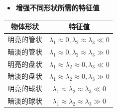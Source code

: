 \begin{frame}
\begin{itemize}
\item \textbf{增强不同形状所需的特征值}
\end{itemize}
\begin{table}[h]
\renewcommand{\arraystretch}{0.5}
\centering
\begin{tabular*}{80mm}{cc}
\toprule
\hspace{5mm} \bfseries \small{物体形状}  & \hspace{15mm}                    \bfseries \small{特征值}                       \\
\midrule
\hspace{5mm} \small{明亮的管状}          & \hspace{15mm}  \small{$\lambda_1 \approx 0, \lambda_2 \approx \lambda_3 \ll 0$} \\
\hspace{5mm} \small{暗淡的管状}          & \hspace{15mm}  \small{$\lambda_1 \approx 0, \lambda_2 \approx \lambda_3 \gg 0$} \\
\hspace{5mm} \small{明亮的盘状}          & \hspace{15mm}  \small{$\lambda_1 \approx \lambda_2 \approx 0, \lambda_3 \ll 0$} \\
\hspace{5mm} \small{暗淡的盘状}          & \hspace{15mm}  \small{$\lambda_1 \approx \lambda_2 \approx 0, \lambda_3 \gg 0$} \\
\hspace{5mm} \small{明亮的球状}          & \hspace{15mm}  \small{$\lambda_1 \approx \lambda_2 \approx \lambda_3 \ll 0$}    \\
\hspace{5mm} \small{暗淡的球状}          & \hspace{15mm}  \small{$\lambda_1 \approx \lambda_2 \approx \lambda_3 \gg 0$}    \\
\bottomrule
\end{tabular*}
\end{table}
\end{frame}

